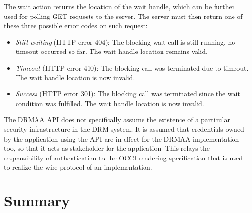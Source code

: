 \documentclass[twocolumn]{svjour3}       %
\begin{document}
The wait action returns the location of the wait handle, which can be further used for polling GET requests to the server. The server must then return one of these three possible error codes on such request:

\begin{itemize}
\item \emph{Still waiting} (HTTP error 404): The blocking wait call is still running, no timeout occurred so far. The wait handle location remains valid.
\item \emph{Timeout} (HTTP error 410): The blocking call was terminated due to timeout. The wait handle location is now invalid.
\item \emph{Success} (HTTP error 301): The blocking call was terminated since the wait condition was fulfilled. The wait handle location is now invalid.
\end{itemize}

The DRMAA API does not specifically assume the existence of a particular security infrastructure in the DRM system. It is assumed that credentials owned by the application using the API are in effect for the DRMAA implementation too, so that it acts as stakeholder for the application. This relays the responsibility of authentication to the OCCI rendering specification that is used to realize the wire protocol of an implementation. 

\section{Summary}

\printglossaries


\end{document}
